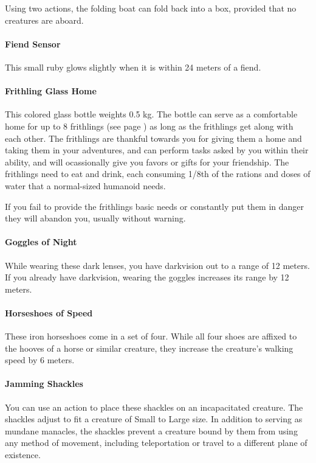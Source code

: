         Using two actions, the folding boat can fold back into a box, provided that no creatures are aboard.
    \paragraph{Fiend Sensor}
        This small ruby glows slightly when it is within 24 meters of a fiend.
    \paragraph{Frithling Glass Home} %
        This colored glass bottle weights 0.5 kg.
        The bottle can serve as a comfortable home for up to 8 frithlings (see page \pageref{creature::frithling}) as long as the frithlings get along with each other.
        The frithlings are thankful towards you for giving them a home and taking them in your adventures, and can perform tasks asked by you within their ability, and will ocassionally give you favors or gifts for your friendship.
        The frithlings need to eat and drink, each consuming 1/8th of the rations and doses of water that a normal-sized humanoid needs.

        If you fail to provide the frithlings basic needs or constantly put them in danger they will abandon you, usually without warning.
    \paragraph{Goggles of Night}
        While wearing these dark lenses, you have darkvision out to a range of 12 meters.
        If you already have darkvision, wearing the goggles increases its range by 12 meters.
    \paragraph{Horseshoes of Speed}
        These iron horseshoes come in a set of four.
        While all four shoes are affixed to the hooves of a horse or similar creature, they increase the creature's walking speed by 6 meters.
    \paragraph{Jamming Shackles}
        You can use an action to place these shackles on an incapacitated creature.
        The shackles adjust to fit a creature of Small to Large size.
        In addition to serving as mundane manacles, the shackles prevent a creature bound by them from using any method of movement, including teleportation or travel to a different plane of existence.

